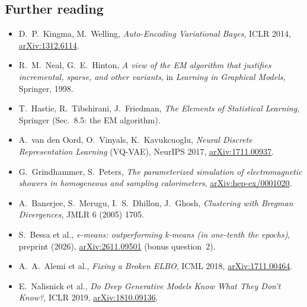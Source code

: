 \documentclass[a4paper,12pt]{article}
\begin{document}
\subsection*{Further reading}
\begin{itemize}\setlength\itemsep{0pt}
\item D.~P.~Kingma, M.~Welling, \emph{Auto-Encoding Variational Bayes}, ICLR 2014, \href{https://arxiv.org/abs/1312.6114}{arXiv:1312.6114}.
\item R.~M.~Neal, G.~E.~Hinton, \emph{A view of the EM algorithm that justifies incremental, sparse, and other variants}, in \emph{Learning in Graphical Models}, Springer, 1998.
\item T.~Hastie, R.~Tibshirani, J.~Friedman, \emph{The Elements of Statistical Learning}, Springer (Sec.~8.5: the EM algorithm).
\item A.~van den Oord, O.~Vinyals, K.~Kavukcuoglu, \emph{Neural Discrete Representation Learning} (VQ-VAE), NeurIPS 2017, \href{https://arxiv.org/abs/1711.00937}{arXiv:1711.00937}.
\item G.~Grindhammer, S.~Peters, \emph{The parameterized simulation of electromagnetic showers in homogeneous and sampling calorimeters}, \href{https://arxiv.org/abs/hep-ex/0001020}{arXiv:hep-ex/0001020}.
\item A.~Banerjee, S.~Merugu, I.~S.~Dhillon, J.~Ghosh, \emph{Clustering with Bregman Divergences}, JMLR 6 (2005) 1705.
\item S.~Bessa et al., \emph{e-means: outperforming k-means (in one-tenth the epochs)}, preprint (2026), \href{https://arxiv.org/abs/2611.09501}{arXiv:2611.09501} (bonus question~2).
\item A.~A.~Alemi et al., \emph{Fixing a Broken ELBO}, ICML 2018, \href{https://arxiv.org/abs/1711.00464}{arXiv:1711.00464}.
\item E.~Nalisnick et al., \emph{Do Deep Generative Models Know What They Don't Know?}, ICLR 2019, \href{https://arxiv.org/abs/1810.09136}{arXiv:1810.09136}.
\end{itemize}
\end{document}
